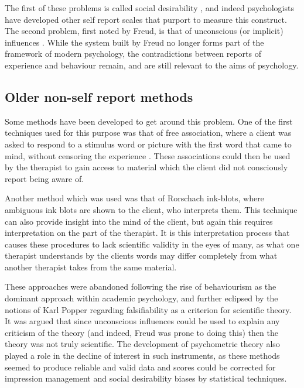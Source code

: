 The first of these problems is called social desirability \cite{Egloff2003}, and indeed psychologists have developed other self report scales that purport to measure this construct. The second problem, first noted by Freud, is that of unconscious (or implicit) influences \cite{Hofmann2008}. While the system built by Freud no longer forms part of the framework of modern psychology, the contradictions between reports of experience and behaviour remain, and are still relevant to the aims of psychology. %

\subsection{Older non-self report methods}
\label{sec:older-non-self}

Some methods have been developed to get around this problem. One of the first techniques used for this purpose was that of free association, where a client was asked to respond to a stimulus word or picture with the first word that came to mind, without censoring the experience \cite{Hofmann2008}. These associations could then be used by the therapist to gain access to material which the client did not consciously report being aware of. 

Another method which was used was that of Rorschach ink-blots, where ambiguous ink blots are shown to the client, who interprets them. This technique can also provide insight into the mind of the client, but again this requires interpretation on the part of the therapist. It is this interpretation process that causes these procedures to lack scientific validity in the eyes of many, as what one therapist understands by the clients words may differ completely from what another therapist takes from the same material. 

These approaches were abandoned following the rise of behaviourism as the dominant approach within academic psychology, and further eclipsed by the notions of Karl Popper regarding falsifiability as a criterion for scientific theory. It was argued that since unconscious influences could be used to explain any criticism of the theory (and indeed, Freud was prone to doing this) then the theory was not truly scientific. The development of psychometric theory also played a role in the decline of interest in such instruments, as these methods seemed to produce reliable and valid data and scores could be corrected for impression management and social desirability biases by statistical techniques. 

